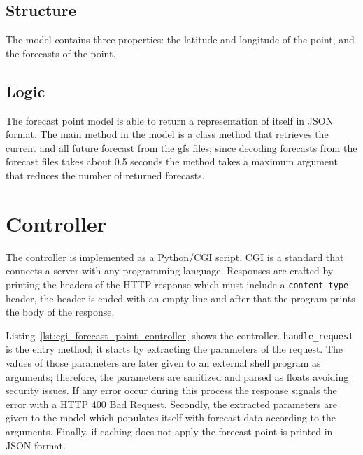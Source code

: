 \subsection*{Structure}
The model contains three properties: the latitude and longitude of the point, and
the forecasts of the point.

\subsection*{Logic}
The forecast point model is able to return a representation of itself in JSON
format. The main method in the model is a class method that retrieves the current
and all future forecast from the gfs files; since decoding forecasts from the
forecast files takes about 0.5 seconds the method takes a maximum argument that
reduces the number of returned forecasts.

\section{Controller}
 The controller is implemented as a Python/CGI script. CGI is a standard that
connects a server with any programming language. Responses are crafted by
printing the headers of the HTTP response which must include a
\verb|content-type| header, the header is ended with an empty line and after that
the program prints the body of the response.

Listing~\ref{lst:cgi_forecast_point_controller} shows the
controller. \verb|handle_request| is the entry method; it starts by extracting
the parameters of the request. The values of those parameters are later given to
an external shell program as arguments; therefore, the parameters are sanitized
and parsed as floats avoiding security issues. If any error occur during this
process the response signals the error with a HTTP 400 Bad Request. Secondly, the
extracted parameters are given to the model which populates itself with forecast
data according to the arguments. Finally, if caching does not apply the forecast
point is printed in JSON format. 

